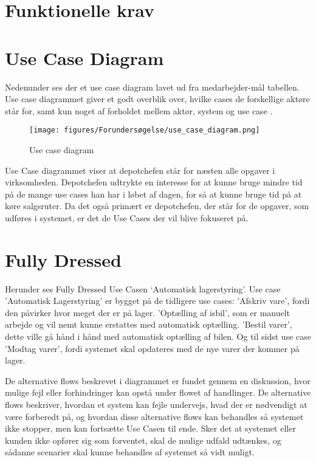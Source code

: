 \section{Funktionelle krav}\label{sec:funktionelle-krav}

\section{Use Case Diagram}
Nedenunder ses der et use case diagram lavet ud fra medarbejder-mål tabellen. Use case diagrammet giver et godt overblik over, hvilke cases de forskellige aktøre står for, samt kun noget af forholdet mellem aktør, system og use case \cite{visual-paradigm.com}. 

\begin{figure}[H]
    \centering
    \texttt{[image: figures/Forundersøgelse/use\_case\_diagram.png]}
    \caption{Use case diagram}
    \label{fig:use_case_diagram}
\end{figure}

Use Case diagrammet viser at depotchefen står for næsten alle opgaver i virksomheden. Depotchefen udtrykte en interesse for at kunne bruge mindre tid på de mange use cases han har i løbet af dagen, for så at kunne bruge tid på at køre salgsruter. Da det også primært er depotchefen, der står for de opgaver, som udføres i systemet, er det de Use Cases der vil blive fokuseret på.

\section{Fully Dressed} \label{fullydressed}

Herunder ses Fully Dressed Use Casen ‘Automatisk lagerstyring’. Use case 'Automatisk Lagerstyring' er bygget på de tidligere use cases: 'Afskriv vare', fordi den påvirker hvor meget der er på lager. 'Optælling af isbil', som er manuelt arbejde og vil nemt kunne erstattes med automatisk optælling. 'Bestil varer', dette ville gå hånd i hånd med automatisk optælling af bilen. Og til sidst use case 'Modtag varer', fordi systemet skal opdateres med de nye varer der kommer på lager. 

De alternative flows beskrevet i diagrammet er fundet gennem en diskussion, hvor mulige fejl eller forhindringer kan opstå under flowet af handlinger. De alternative flows beskriver, hvordan et system kan fejle undervejs, hvad der er nødvendigt at være forberedt på, og hvordan disse alternative flows kan behandles så systemet ikke stopper, men kan fortsætte Use Casen til ende. Sker det at systemet eller kunden ikke opfører sig som forventet, skal de mulige udfald udtænkes, og sådanne scenarier skal kunne behandles af systemet så vidt muligt.


